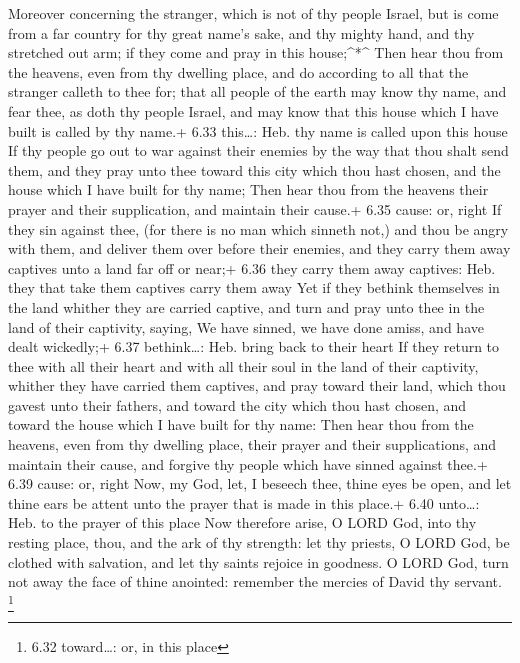  Moreover concerning the stranger, which is not of thy
people Israel, but is come from a far country for thy great name's sake,
and thy mighty hand, and thy stretched out arm; if they come and pray in
this house;\^{}*\^{}  Then hear thou from the heavens, even
from thy dwelling place, and do according to all that the stranger
calleth to thee for; that all people of the earth may know thy name, and
fear thee, as doth thy people Israel, and may know that this house which
I have built is called by thy name.+ 6.33 this\ldots: Heb. thy name is
called upon this house  If thy people go out to war against
their enemies by the way that thou shalt send them, and they pray unto
thee toward this city which thou hast chosen, and the house which I have
built for thy name;  Then hear thou from the heavens their
prayer and their supplication, and maintain their cause.+ 6.35 cause:
or, right  If they sin against thee, (for there is no man
which sinneth not,) and thou be angry with them, and deliver them over
before their enemies, and they carry them away captives unto a land far
off or near;+ 6.36 they carry them away captives: Heb. they that take
them captives carry them away  Yet if they bethink
themselves in the land whither they are carried captive, and turn and
pray unto thee in the land of their captivity, saying, We have sinned,
we have done amiss, and have dealt wickedly;+ 6.37 bethink\ldots: Heb.
bring back to their heart  If they return to thee with all
their heart and with all their soul in the land of their captivity,
whither they have carried them captives, and pray toward their land,
which thou gavest unto their fathers, and toward the city which thou
hast chosen, and toward the house which I have built for thy name:
 Then hear thou from the heavens, even from thy dwelling
place, their prayer and their supplications, and maintain their cause,
and forgive thy people which have sinned against thee.+ 6.39 cause: or,
right  Now, my God, let, I beseech thee, thine eyes be
open, and let thine ears be attent unto the prayer that is made in this
place.+ 6.40 unto\ldots: Heb. to the prayer of this place 
Now therefore arise, O LORD God, into thy resting place, thou, and the
ark of thy strength: let thy priests, O LORD God, be clothed with
salvation, and let thy saints rejoice in goodness.  O LORD
God, turn not away the face of thine anointed: remember the mercies of
David thy servant. \footnote{6.32 toward\ldots: or, in this place}

